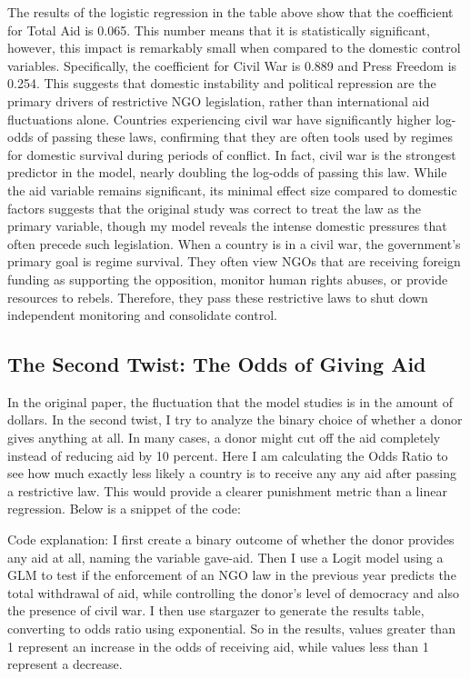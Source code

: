 \documentclass[12pt, a4paper]{article}
\begin{document}
The results of the logistic regression in the table above show that the coefficient for Total Aid is 0.065. This number means that it is statistically significant, however, this impact is remarkably small when compared to the domestic control variables. Specifically, the coefficient for Civil War is 0.889 and Press Freedom is 0.254. This suggests that domestic instability and political repression are the primary drivers of restrictive NGO legislation, rather than international aid fluctuations alone. Countries experiencing civil war have significantly higher log-odds of passing these laws, confirming that they are often tools used by regimes for domestic survival during periods of conflict. In fact, civil war is the strongest predictor in the model, nearly doubling the log-odds of passing this law. While the aid variable remains significant, its minimal effect size compared to domestic factors suggests that the original study was correct to treat the law as the primary variable, though my model reveals the intense domestic pressures that often precede such legislation. When a country is in a civil war, the government’s primary goal is regime survival. They often view NGOs that are receiving foreign funding as supporting the opposition, monitor human rights abuses, or provide resources to rebels. Therefore, they pass these restrictive laws to shut down independent monitoring and consolidate control.

\subsection{The Second Twist: The Odds of Giving Aid}
In the original paper, the fluctuation that the model studies is in the amount of dollars. In the second twist, I try to analyze the binary choice of whether a donor gives anything at all. In many cases, a donor might cut off the aid completely instead of reducing aid by 10 percent. Here I am calculating the Odds Ratio to see how much exactly less likely a country is to receive any any aid after passing a restrictive law. This would provide a clearer punishment metric than a linear regression.
\newline Below is a snippet of the code:


Code explanation: I first create a binary outcome of whether the donor provides any aid at all, naming the variable gave-aid. Then I use a Logit model using a GLM to test if the enforcement of an NGO law in the previous year predicts the total withdrawal of aid, while controlling the donor’s level of democracy and also the presence of civil war. I then use stargazer to generate the results table, converting to odds ratio using exponential. So in the results, values greater than 1 represent an increase in the odds of receiving aid, while values less than 1 represent a decrease.
\end{document}
